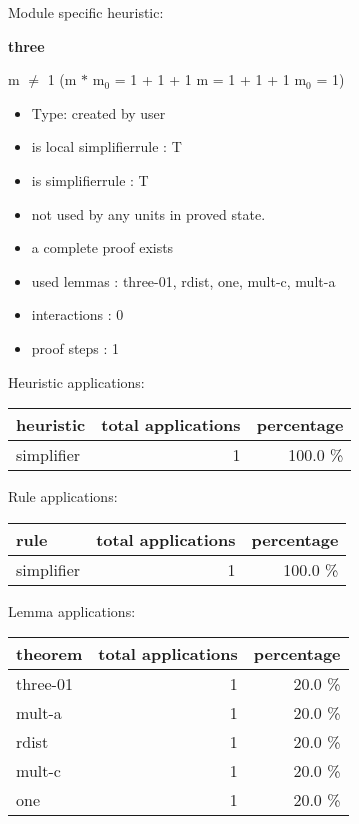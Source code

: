\documentclass[a4paper]{article}
\begin{document}
Module specific heuristic:

\pagebreak

{\LARGE\bf three}\label{lemma-three}

\medskip

 \Fol m $\neq$ 1 \Imp (m $*$ $\mbox{m}_{0}$ = 1 + 1 + 1 \Equiv m = 1 + 1 + 1 \And $\mbox{m}_{0}$ = 1)

\begin{itemize}

\item Type: created by user

\item is local simplifierrule : T
\item is simplifierrule : T
\item not used by any units in proved state.
\item       a complete proof exists
\item       used lemmas  : three-01, rdist, one, mult-c, mult-a
\item       interactions : 0
\item       proof steps  : 1
\end{itemize}

\medskip


Heuristic applications:

\begin{supertabular}{l|r|r}
heuristic	& total applications & percentage \\ \hline
simplifier & 1 & 100.0 \% \\

\end{supertabular}

Rule applications:

\begin{supertabular}{l|r|r}
rule	        & total applications & percentage \\ \hline
simplifier & 1 & 100.0 \% \\

\end{supertabular}

Lemma applications:

\begin{supertabular}{l|r|r}
theorem	        & total applications & percentage \\ \hline
three-01 & 1 & 20.0 \% \\
mult-a & 1 & 20.0 \% \\
rdist & 1 & 20.0 \% \\
mult-c & 1 & 20.0 \% \\
one & 1 & 20.0 \% \\

\end{supertabular}
\end{document}
